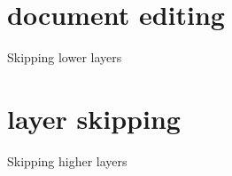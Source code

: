 %																
%																
%																
\section{document editing}
Skipping lower layers



%																
%																
%																
\section{layer skipping}
Skipping higher layers

\renewcommand{\present}[0]{{\tt present}}					%
\renewcommand{\interpret}[0]{{\tt interpret}}				%
                                                                          
